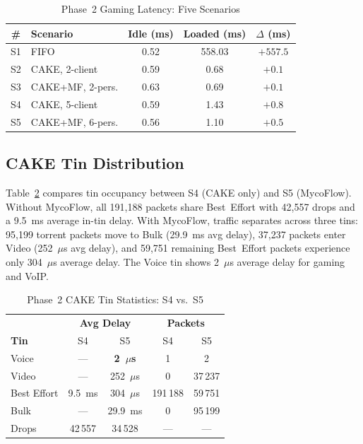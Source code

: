 \begin{table}[h]
\caption{Phase~2 Gaming Latency: Five Scenarios}
\label{tab:phase2}
\centering
\small
\begin{tabular}{clccc}
\toprule
\textbf{\#} & \textbf{Scenario} & \textbf{Idle (ms)} & \textbf{Loaded (ms)} & \textbf{$\Delta$ (ms)} \\
\midrule
S1 & FIFO              & 0.52 & 558.03 & $+557.5$ \\
S2 & CAKE, 2-client    & 0.59 &   0.68 & $+0.1$   \\
S3 & CAKE+MF, 2-pers.  & 0.63 &   0.69 & $+0.1$   \\
S4 & CAKE, 5-client    & 0.59 &   1.43 & $+0.8$   \\
S5 & CAKE+MF, 6-pers.  & 0.56 &   1.10 & $+0.5$   \\
\bottomrule
\end{tabular}
\end{table}

\subsection{CAKE Tin Distribution}

Table~\ref{tab:tins2} compares tin occupancy between S4 (CAKE only) and S5 (MycoFlow). Without MycoFlow, all 191,188 packets share Best~Effort with 42,557 drops and a 9.5~ms average in-tin delay. With MycoFlow, traffic separates across three tins: 95,199 torrent packets move to Bulk (29.9~ms avg delay), 37,237 packets enter Video (252~$\mu$s avg delay), and 59,751 remaining Best~Effort packets experience only 304~$\mu$s average delay. The Voice tin shows 2~$\mu$s average delay for gaming and VoIP.

\begin{table}[h]
\caption{Phase~2 CAKE Tin Statistics: S4 vs.\ S5}
\label{tab:tins2}
\centering
\small
\begin{tabular}{lcccc}
\toprule
& \multicolumn{2}{c}{\textbf{Avg Delay}} & \multicolumn{2}{c}{\textbf{Packets}} \\
\textbf{Tin} & S4 & S5 & S4 & S5 \\
\midrule
Voice       & ---    & \textbf{2~$\mu$s}   & 1         & 2 \\
Video       & ---    & 252~$\mu$s          & 0         & 37\,237 \\
Best Effort & 9.5~ms & 304~$\mu$s          & 191\,188  & 59\,751 \\
Bulk        & ---    & 29.9~ms             & 0         & 95\,199 \\
\midrule
Drops       & 42\,557 & 34\,528            & --- & --- \\
\bottomrule
\end{tabular}
\end{table}

